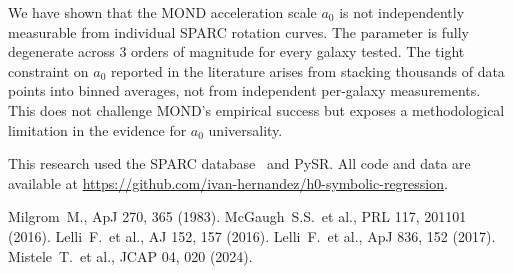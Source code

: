 \documentclass[twocolumn]{aastex631}
\begin{document}
We have shown that the MOND acceleration scale $a_0$ is not independently
measurable from individual SPARC rotation curves.  The parameter is fully
degenerate across 3 orders of magnitude for every galaxy tested.  The
tight constraint on $a_0$ reported in the literature arises from stacking
thousands of data points into binned averages, not from independent
per-galaxy measurements.  This does not challenge MOND's empirical
success but exposes a methodological limitation in the evidence for
$a_0$ universality.

\begin{acknowledgments}
This research used the SPARC database~\cite{lelli2016} and PySR.
All code and data are available at
\url{https://github.com/ivan-hernandez/h0-symbolic-regression}.
\end{acknowledgments}

\begin{thebibliography}{}
 Milgrom~M., ApJ 270, 365 (1983).
 McGaugh~S.S.\ et al., PRL 117, 201101 (2016).
 Lelli~F.\ et al., AJ 152, 157 (2016).
 Lelli~F.\ et al., ApJ 836, 152 (2017).
 Mistele~T.\ et al., JCAP 04, 020 (2024).
\end{thebibliography}
\end{document}
